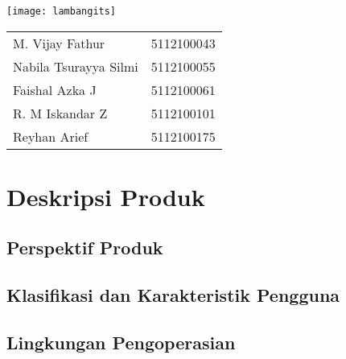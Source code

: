 \documentclass[12pt, a4paper, oneside]{book}
\begin{document}
	\begin{center}
	\end{center}
	\begin{center}
		\texttt{[image: lambangits]}
		\linebreak
			\begin{table}[h]
				\centering
				\begin{tabular}{lr}
					M. Vijay Fathur       & 5112100043 \\
					Nabila Tsurayya Silmi & 5112100055 \\
					Faishal Azka J        & 5112100061 \\
					R. M Iskandar Z       & 5112100101 \\
					Reyhan Arief          & 5112100175 \\
				\end{tabular}
			\end{table}
		\end{center}
		\begin{center}
		{		
		}
	\end{center}
	
	\thispagestyle{empty}
	\pagebreak
	\tableofcontents
	\pagebreak
	\listoffigures
	\pagebreak
	\chapter{Deskripsi Produk}
	\section{Perspektif Produk}
		
	\section{Klasifikasi dan Karakteristik Pengguna}
		
	\section{Lingkungan Pengoperasian}
		
\end{document}
